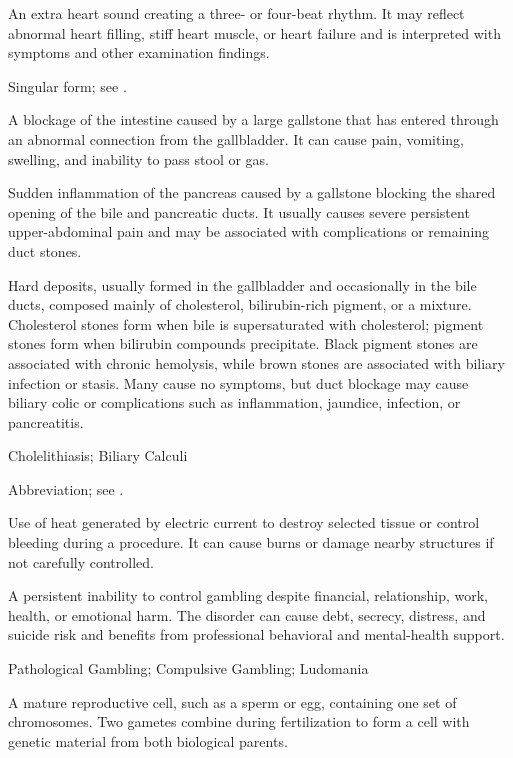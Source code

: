  An extra heart sound creating a three- or four-beat rhythm. It may reflect abnormal heart filling, stiff heart muscle, or heart failure and is interpreted with symptoms and other examination findings.

 Singular form; see .

 A blockage of the intestine caused by a large gallstone that has entered through an abnormal connection from the gallbladder. It can cause pain, vomiting, swelling, and inability to pass stool or gas.

 Sudden inflammation of the pancreas caused by a gallstone blocking the shared opening of the bile and pancreatic ducts. It usually causes severe persistent upper-abdominal pain and may be associated with complications or remaining duct stones.

 Hard deposits, usually formed in the gallbladder and occasionally in the bile
ducts, composed mainly of cholesterol, bilirubin-rich pigment, or a mixture. Cholesterol stones form
when bile is supersaturated with cholesterol; pigment stones form when bilirubin compounds
precipitate. Black pigment stones are associated with chronic hemolysis, while brown stones are
associated with biliary infection or stasis. Many cause no symptoms, but duct blockage may cause
biliary colic or complications such as inflammation, jaundice, infection, or pancreatitis.

\synonyms
Cholelithiasis; Biliary Calculi

 Abbreviation; see .

 Use of heat generated by electric current to destroy selected tissue or control bleeding during a procedure. It can cause burns or damage nearby structures if not carefully controlled.

 A persistent inability to control gambling despite financial, relationship, work, health, or emotional harm. The disorder can cause debt, secrecy, distress, and suicide risk and benefits from professional behavioral and mental-health support.

\synonyms
Pathological Gambling; Compulsive Gambling; Ludomania

 A mature reproductive cell, such as a sperm or egg, containing one set of chromosomes. Two gametes combine during fertilization to form a cell with genetic material from both biological parents.


